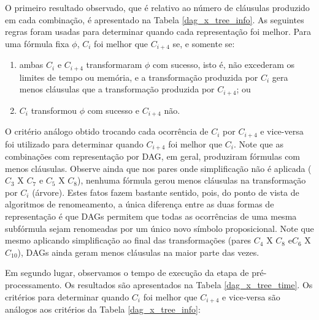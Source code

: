 O primeiro resultado observado, que é relativo ao número de cláusulas produzido em cada combinação, é apresentado na Tabela \ref{dag_x_tree_info}. As seguintes regras foram usadas para determinar quando cada representação foi melhor. Para uma fórmula fixa $\phi$, $C_i$ foi melhor que $C_{i+4}$ se, e somente se:
\begin{enumerate}
	\item ambas $C_i$ e $C_{i+4}$ transformaram $\phi$ com sucesso, isto é, não excederam os limites de tempo ou memória, e a transformação produzida por $C_i$ gera menos cláusulas que a transformação produzida por $C_{i+4}$; ou
	\item $C_i$ transformou $\phi$ com sucesso e $C_{i+4}$ não.
\end{enumerate}
O critério análogo obtido trocando cada ocorrência de $C_i$ por $C_{i+4}$ e vice-versa foi utilizado para determinar quando $C_{i+4}$ foi melhor que $C_i$. Note que as combinações com representação por DAG, em geral, produziram fórmulas com menos cláusulas. Observe ainda que nos pares onde simplificação não é aplicada ($C_3$ X $C_7$ e $C_5$ X $C_8$), nenhuma fórmula gerou menos cláusulas na transformação por $C_i$ (árvore). Estes fatos fazem bastante sentido, pois, do ponto de vista de algoritmos de renomeamento, a única diferença entre as duas formas de representação é que DAGs permitem que todas as ocorrências de uma mesma subfórmula sejam renomeadas por um único novo símbolo proposicional. Note que mesmo aplicando simplificação ao final das transformações (pares $C_4$ X $C_8$ e\break $C_6$ X $C_{10}$), DAGs ainda geram menos cláusulas na maior parte das vezes.


Em segundo lugar, observamos o tempo de execução da etapa de pré-processamento. Os resultados são apresentados na Tabela \ref{dag_x_tree_time}. Os critérios para determinar quando $C_i$ foi melhor que $C_{i+4}$ e vice-versa são análogos aos critérios da Tabela \ref{dag_x_tree_info}: 





